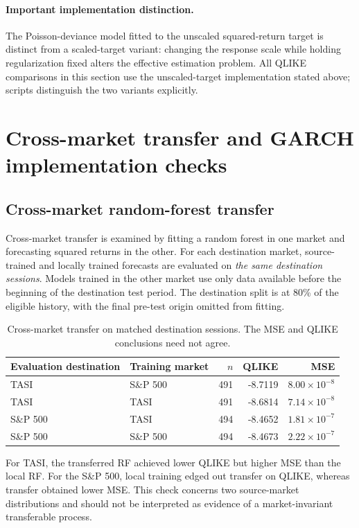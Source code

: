 \paragraph{Important implementation distinction.} The Poisson-deviance model fitted to the unscaled squared-return target is distinct from a scaled-target variant: changing the response scale while holding regularization fixed alters the effective estimation problem. All QLIKE comparisons in this section use the unscaled-target implementation stated above; scripts distinguish the two variants explicitly.

\section{Cross-market transfer and GARCH implementation checks}
\subsection{Cross-market random-forest transfer}
Cross-market transfer is examined by fitting a random forest in one market and forecasting squared returns in the other. For each destination market, source-trained and locally trained forecasts are evaluated on \emph{the same destination sessions}. Models trained in the other market use only data available before the beginning of the destination test period. The destination split is at 80\% of the eligible history, with the final pre-test origin omitted from fitting.
\begin{table}[ht]\centering\small
\caption{Cross-market transfer on matched destination sessions. The MSE and QLIKE conclusions need not agree.}
\begin{tabular}{llrrr}\toprule
Evaluation destination & Training market & $n$ & QLIKE & MSE\\\midrule
TASI & S\&P 500 & 491 & -8.7119 & $8.00\times10^{-8}$\\
TASI & TASI & 491 & -8.6814 & $7.14\times10^{-8}$\\
S\&P 500 & TASI & 494 & -8.4652 & $1.81\times10^{-7}$\\
S\&P 500 & S\&P 500 & 494 & -8.4673 & $2.22\times10^{-7}$\\\bottomrule
\end{tabular}\end{table}
For TASI, the transferred RF achieved lower QLIKE but higher MSE than the local RF. For the S\&P 500, local training edged out transfer on QLIKE, whereas transfer obtained lower MSE. This check concerns two source-market distributions and should not be interpreted as evidence of a market-invariant transferable process.

